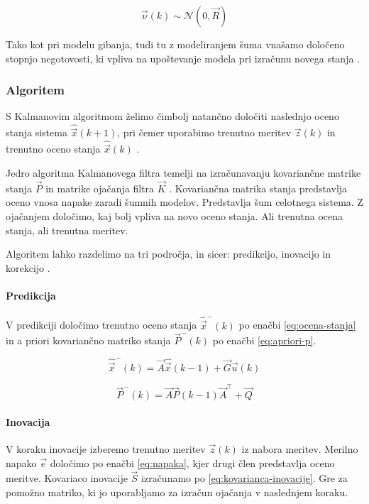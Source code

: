 {\begin{equation}
\vec{\nu}(k) \sim \mathcal{N} \left( 0, \vec{R} \right)
\label{eq:sum-merilnega-modela}
\end{equation}


Tako kot pri modelu gibanja, tudi tu z modeliranjem šuma vnašamo določeno stopnjo negotovosti, ki vpliva na upoštevanje modela pri izračunu novega stanja \cite{trucco1998introductory}.


\subsubsection{Algoritem}
S Kalmanovim algoritmom želimo čimbolj natančno določiti naslednjo oceno stanja sistema $\hat{\vec{x}}(k+1)$, pri čemer uporabimo trenutno meritev $\vec{z}(k)$ in trenutno oceno stanja $\hat{\vec{x}}(k)$ \cite{trucco1998introductory}. 

Jedro algoritma Kalmanovega filtra temelji na izračunavanju kovariančne matrike stanja $\vec{P}$ in matrike ojačanja filtra $\vec{K}$ \cite{trucco1998introductory}. Kovariančna matrika stanja predstavlja oceno vnosa napake zaradi šumnih modelov. Predstavlja šum celotnega sistema. Z ojačanjem določimo, kaj bolj vpliva na novo oceno stanja. Ali trenutna ocena stanja, ali trenutna meritev.

Algoritem lahko razdelimo na tri področja, in sicer: predikcijo, inovacijo in korekcijo \cite{trucco1998introductory}.

\paragraph{Predikcija}
V predikciji določimo trenutno oceno stanja $\hat{\vec{x}}^-(k)$ po enačbi \eqref{eq:ocena-stanja} in a priori kovariančno matriko stanja $\vec{P}^-(k)$ po enačbi \eqref{eq:apriori-p}.

\begin{equation}
	\hat{\vec{x}}^-(k) = \vec{A} \hat{\vec{x}}(k-1) + \vec{G} \vec{u}(k)
    \label{eq:ocena-stanja}
\end{equation}

\begin{equation}
	\vec{P}^-(k) = \vec{A} \vec{P}(k-1) \vec{A}^\top + \vec{Q}
    \label{eq:apriori-p}
\end{equation}

\paragraph{Inovacija}
V koraku inovacije izberemo trenutno meritev $\vec{z}(k)$ iz nabora meritev. Merilno napako $\vec{e}$ določimo po enačbi \eqref{eq:napaka}, kjer drugi člen predstavlja oceno meritve. Kovariaco inovacije $\vec{S}$ izračunamo po \eqref{eq:kovarianca-inovacije}. Gre za pomožno matriko, ki jo uporabljamo za izračun ojačanja v naslednjem koraku.

}

